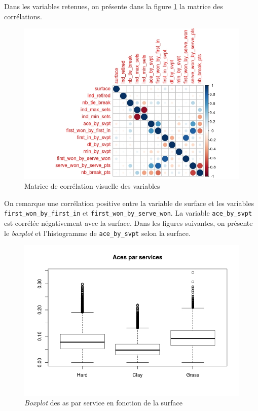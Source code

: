 Dans les variables retenues, on présente dans la figure \ref{fig:corrplot} la matrice des corrélations.

\begin{figure}[H]
	\caption{Matrice de corrélation visuelle des variables}
	\label{fig:corrplot}
	\includegraphics[width=\textwidth]{corrplot}
\end{figure}

On remarque une corrélation positive entre la variable de surface et les variables \texttt{first\_won\_by\_first\_in} et \texttt{first\_won\_by\_serve\_won}. La variable \texttt{ace\_by\_svpt} est corrélée négativement avec la surface. Dans les figures suivantes, on présente le \textit{boxplot} et l'histogramme de \texttt{ace\_by\_svpt} selon la surface.

\begin{figure}[H]
	\caption{\textit{Boxplot} des as par service en fonction de la surface}
	\label{fig:acebyserve}
	\includegraphics[width=\textwidth]{acevssurface}
\end{figure}

